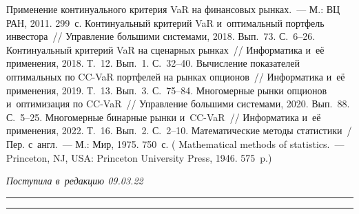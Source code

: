 \begin{multicols}{2}
{\small\frenchspacing
 {%
 \begin{thebibliography}{9}
   Применение континуального критерия VaR на 
финансовых рынках.~--- М.: ВЦ РАН, 2011. 299~с. 
   Континуальный критерий VaR и~оптимальный 
портфель инвестора~// Управ\-ле\-ние большими сис\-те\-ма\-ми, 2018. Вып.~73. 
С.~6--26.
   Континуальный критерий VaR на сценарных рынках~// 
Информатика и~её применения, 2018. Т.~12. Вып.~1. С.~32--40. 
   Вычисление показателей оптимальных по CC-VaR 
портфелей на рынках опционов~// Информатика и~её применения, 2019. Т.~13. 
Вып.~3. С.~75--84. 
   Многомерные рынки опционов и~оптимизация по  
CC-VaR~// Управ\-ле\-ние большими сис\-те\-ма\-ми, 2020. Вып.~88. С.~5--25.
   Многомерные бинарные рынки и~CC-VaR~// 
Информатика и~её применения, 2022. Т.~16. Вып.~2. С.~2--10.
   Математические методы статистики~/ Пер. с~англ.~--- М.: 
Мир, 1975. 750~с. ( Mathematical methods of statistics.~--- 
Princeton, NJ, USA: Princeton University Press, 1946. 575~p.)
\end{thebibliography}

 }
 }

\end{multicols}

\vspace*{-6pt}

\hfill{\small\textit{Поступила в~редакцию 09.03.22}}

\vspace*{8pt}




\hrule

\vspace*{2pt}

\hrule


\def\tit{MULTIDIMENSIONAL BUTTERFLIES IN~PROBLEMS 
OF~OPTIMIZATION ON CC-VaR}


\def\titkol{Multidimensional butterflies in~problems 
of~optimization on CC-VaR}


